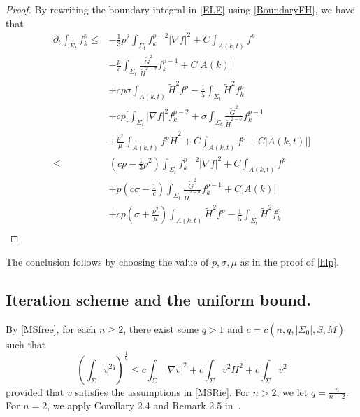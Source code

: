\begin{proof}
    By rewriting the boundary integral in \autoref{ELE} using \autoref{BoundaryFH}, we have that
    \begin{equation*}
        \begin{split}
            \partial_t \int_{\Sigma_t} f_k^p
        \leq &  -\frac{1}{3}p^2 \int_{\Sigma_t} f_{k}^{p-2}\left| \nabla f \right| ^2+C \int_{A(k,t)} f^p  \\
        &-\frac{p}{c} \int_{\Sigma_t} \frac{\tilde{G}^2}{\tilde{H}^{2-\sigma }}f_{k}^{p-1}+C \left| A(k) \right|\\
        &+cp \sigma \int_{A(k,t)}^{}\tilde{H}^2f^p-\frac{1}{5}\int_{\Sigma_t} \tilde{H}^2f_{k}^{p} \\
        &+cp \bigg[  \int_{\Sigma_t} \left| \nabla f \right| ^2 f_{k}^{p-2} + \sigma \int_{\Sigma_t} \frac{\tilde{G}^{2} }{\tilde{H}^{2-\sigma } } f_{k}^{p-1} \\
        &+ \frac{p^2}{\mu }\int_{A(k,t)}^{}f^p \tilde{H}^{2} + C \int_{A(k,t)}^{}f^p + C \left| A(k,t) \right|\bigg]\\
        \leq & \left( cp-\frac{1}{3}p^2 \right) \int_{\Sigma_t} f_{k}^{p-2}\left| \nabla f \right| ^2+C \int_{A(k,t)} f^p  \\
        &+ p\left( c\sigma - \frac{1}{c} \right) \int_{\Sigma_t} \frac{\tilde{G}^2}{\tilde{H}^{2-\sigma }}f_{k}^{p-1}+C \left| A(k) \right|\\
        &+ cp\left(  \sigma + \frac{p^2}{\mu } \right) \int_{A(k,t)}^{}\tilde{H}^2f^p-\frac{1}{5}\int_{\Sigma_t} \tilde{H}^2f_{k}^{p}\\
        \end{split}
        \end{equation*}
\end{proof}
The conclusion follows by choosing the value of $p,\sigma ,\mu $ as in the proof of \autoref{hlp}. 

\subsection{Iteration scheme and the uniform bound.}

By \autoref{MSfree}, for each $n \geq 2$, there exist some $q>1$ and $c=c(n,q,\left| \Sigma_0 \right|,S,\bar{M} )$ such that
\[\left( \int_{\Sigma} v^{2q} \right) ^{\frac{1}{q}} \leq c \int_{\Sigma} \left| \nabla v \right| ^2 + c \int_{\Sigma} v^2 H^2 + c \int_{\Sigma} v^2\]
provided that $v$ satisfies the assumptions in \autoref{MSRie}.
For $n>2$, we let $q=\frac{n}{n-2}$. For $n=2$, we apply Corollary 2.4 and Remark 2.5 in~\cite{edelen_convexity_2016}.

